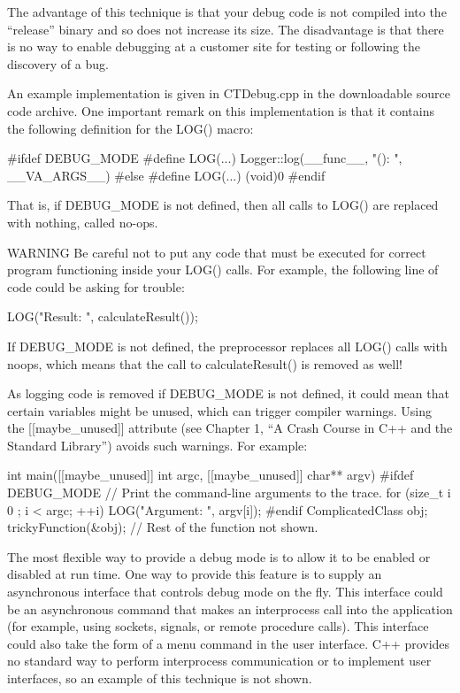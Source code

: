 The advantage of this technique is that your debug code is not compiled into the “release” binary and so does not increase its size. The disadvantage is that there is no way to enable debugging at a customer site for testing or following the discovery of a bug.

An example implementation is given in CTDebug.cpp in the downloadable source code archive. One important remark on this implementation is that it contains the following definition for the LOG() macro:

\begin{cpp}
#ifdef DEBUG_MODE
    #define LOG(...) Logger::log(__func__, "(): ", __VA_ARGS__)
#else
    #define LOG(...) (void)0
#endif
\end{cpp}

That is, if DEBUG\_MODE is not defined, then all calls to LOG() are replaced with nothing, called no-ops.

\begin{myWarning}{WARNING}
Be careful not to put any code that must be executed for correct program functioning inside your LOG() calls. For example, the following line of code could be asking for trouble:

\begin{cpp}
LOG("Result: ", calculateResult());
\end{cpp}

If DEBUG\_MODE is not defined, the preprocessor replaces all LOG() calls with noops, which means that the call to calculateResult() is removed as well!
\end{myWarning}

As logging code is removed if DEBUG\_MODE is not defined, it could mean that certain variables might be unused, which can trigger compiler warnings. Using the [[maybe\_unused]] attribute (see Chapter 1, “A Crash Course in C++ and the Standard Library”) avoids such warnings. For example:

\begin{cpp}
int main([[maybe_unused]] int argc, [[maybe_unused]] char** argv)
{
#ifdef DEBUG_MODE
    // Print the command-line arguments to the trace.
    for (size_t i { 0 }; i < argc; ++i) { LOG("Argument: ", argv[i]); }
#endif
    ComplicatedClass obj;
    trickyFunction(&obj);
    // Rest of the function not shown.
}
\end{cpp}


The most flexible way to provide a debug mode is to allow it to be enabled or disabled at run time. One way to provide this feature is to supply an asynchronous interface that controls debug mode on the fly. This interface could be an asynchronous command that makes an interprocess call into the application (for example, using sockets, signals, or remote procedure calls). This interface could also take the form of a menu command in the user interface. C++ provides no standard way to perform interprocess communication or to implement user interfaces, so an example of this technique is not shown.

